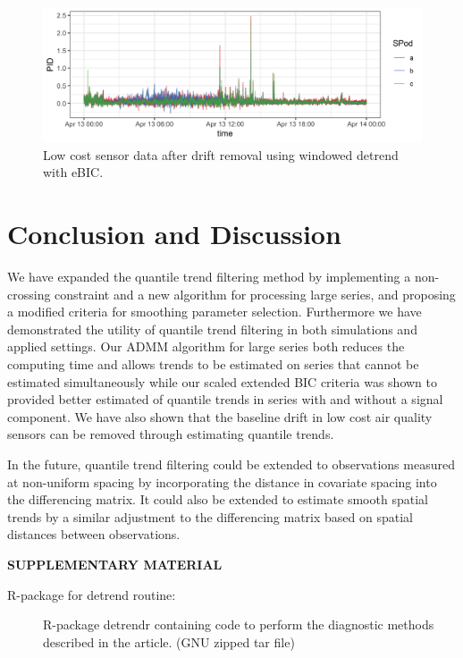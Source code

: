 \documentclass[12pt]{article}
\begin{document}
	\begin{figure}
		\includegraphics[width = \linewidth]{Figures/corrected_data.png}
		\caption{Low cost sensor data after drift removal using windowed detrend with eBIC.}
	\end{figure}

		
	
\section{Conclusion and Discussion}
\label{sec:discussion}

	We have expanded the quantile trend filtering method by implementing a non-crossing constraint and a new algorithm for processing large series, and proposing a modified criteria for smoothing parameter selection. Furthermore we have demonstrated the utility of quantile trend filtering in both simulations and applied settings. Our ADMM algorithm for large series both reduces the computing time and allows trends to be estimated on series that cannot be estimated simultaneously while our scaled extended BIC criteria was shown to provided better estimated of quantile trends in series with and without a signal component. We have also shown that the baseline drift in low cost air quality sensors can be removed through estimating quantile trends.
	 
	In the future, quantile trend filtering could be extended to observations measured at non-uniform spacing by incorporating the distance in covariate spacing into the differencing matrix. It could also be extended to estimate smooth spatial trends by a similar adjustment to the differencing matrix based on spatial distances between observations. 
	
	\label{sec:conc}
	
	
	\bigskip
	\begin{center}
		{\large\bf SUPPLEMENTARY MATERIAL}
	\end{center}
	
	\begin{description}
		
		\item[R-package for detrend routine:] R-package detrendr containing code to perform the diagnostic methods described in the article. (GNU zipped tar file)
				
	\end{description}
	
	
	
	
	
\end{document}
